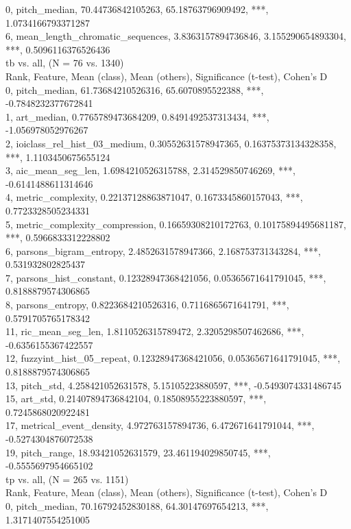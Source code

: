 0, pitch_median, 70.44736842105263, 65.18763796909492, ***, 1.0734166793371287\\
6, mean_length_chromatic_sequences, 3.8363157894736846, 3.155290654893304, ***, 0.5096116376526436\\
tb vs. all, (N = 76 vs. 1340)\\
Rank, Feature, Mean (class), Mean (others), Significance (t-test), Cohen's D\\
0, pitch_median, 61.73684210526316, 65.6070895522388, ***, -0.7848232377672841\\
1, art_median, 0.7765789473684209, 0.8491492537313434, ***, -1.056978052976267\\
2, ioiclass_rel_hist_03_medium, 0.30552631578947365, 0.16375373134328358, ***, 1.1103450675655124\\
3, aic_mean_seg_len, 1.6984210526315788, 2.314529850746269, ***, -0.6141488611314646\\
4, metric_complexity, 0.22137128863871047, 0.1673345860157043, ***, 0.7723328505234331\\
5, metric_complexity_compression, 0.16659308210172763, 0.10175894495681187, ***, 0.5966833312228802\\
6, parsons_bigram_entropy, 2.4852631578947366, 2.168753731343284, ***, 0.531932802825437\\
7, parsons_hist_constant, 0.12328947368421056, 0.05365671641791045, ***, 0.8188879574306865\\
8, parsons_entropy, 0.8223684210526316, 0.7116865671641791, ***, 0.5791705765178342\\
11, ric_mean_seg_len, 1.8110526315789472, 2.3205298507462686, ***, -0.6356155367422557\\
12, fuzzyint_hist_05_repeat, 0.12328947368421056, 0.05365671641791045, ***, 0.8188879574306865\\
13, pitch_std, 4.258421052631578, 5.15105223880597, ***, -0.5493074331486745\\
15, art_std, 0.21407894736842104, 0.18508955223880597, ***, 0.7245868020922481\\
17, metrical_event_density, 4.972763157894736, 6.472671641791044, ***, -0.5274304876072538\\
19, pitch_range, 18.93421052631579, 23.461194029850745, ***, -0.5555697954665102\\
tp vs. all, (N = 265 vs. 1151)\\
Rank, Feature, Mean (class), Mean (others), Significance (t-test), Cohen's D\\
0, pitch_median, 70.16792452830188, 64.30147697654213, ***, 1.3171407554251005\\
